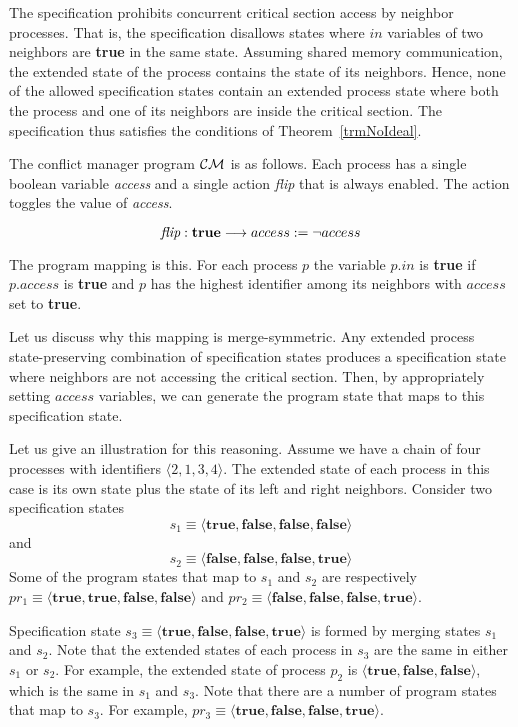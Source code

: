 \documentclass[11pt]{llncs}
\def\PROG#1{${\cal #1}$}
\begin{document}
The specification prohibits concurrent critical section access by
neighbor processes. That is, the specification disallows states where
$in$ variables of two neighbors are \textbf{true} in the same
state. Assuming shared memory communication, the extended state of the
process contains the state of its neighbors. Hence, none of the
allowed specification states contain an extended process state where
both the process and one of its neighbors are inside the critical
section. The specification thus satisfies the conditions of
Theorem~\ref{trmNoIdeal}.

The conflict manager program \PROG{CM} is as follows. Each
process has a single boolean variable \emph{access} and a single
action \emph{flip} that is always enabled. The action toggles the
value of \emph{access}.

\[\emph{flip}: \textbf{true} \longrightarrow access := \neg access \]

The program mapping is this. For each process $p$ the variable $p.in$
is \textbf{true} if $p.access$ is \textbf{true} and $p$ has the
highest identifier among its neighbors with $access$ set to
\textbf{true}.

Let us discuss why this mapping is merge-symmetric.  Any extended
process state-preserving combination of specification states produces
a specification state where neighbors are not accessing the critical
section. Then, by appropriately setting $access$ variables, we can
generate the program state that maps to this specification state.

Let us give an illustration for this reasoning. Assume we have a chain
of four processes with identifiers $\langle 2,1,3,4\rangle$. The
extended state of each process in this case is its own state plus the
state of its left and right neighbors.  Consider two specification
states  
\[s_1 \equiv
\langle\textbf{true}, \textbf{false}, \textbf{false}, \textbf{false}\rangle\]
and 
\[s_2 \equiv
\langle\textbf{false}, \textbf{false}, \textbf{false}, \textbf{true}\rangle\]
Some of the program states that map to $s_1$ and $s_2$ are
respectively $pr_1 \equiv
\langle\textbf{true},\textbf{true},\textbf{false},\textbf{false}\rangle$
and $pr_2 \equiv
\langle\textbf{false},\textbf{false},\textbf{false},\textbf{true}\rangle$.

Specification state $s_3
\equiv\langle\textbf{true},\textbf{false},\textbf{false},\textbf{true}\rangle$
is formed by merging states $s_1$ and $s_2$. Note that the extended
states of each process in $s_3$ are the same in either $s_1$ or
$s_2$. For example, the extended state of process $p_2$ is $\langle
\textbf{true}, \textbf{false}, \textbf{false}\rangle$, which is the
same in $s_1$ and $s_3$. Note that there are a number of program
states that map to $s_3$. For example, $pr_3 \equiv
\langle\textbf{true},\textbf{false},\textbf{false},\textbf{true}\rangle$.
\end{document}
